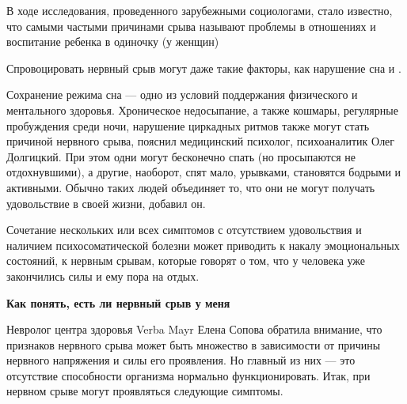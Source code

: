 \begin{framed}
    \begin{center}
        \Large
        В ходе исследования, проведенного зарубежными социологами, стало известно, что самыми частыми причинами срыва называют проблемы в отношениях и воспитание ребенка в одиночку (у женщин)
    \end{center}
\end{framed}

Спровоцировать нервный срыв могут даже такие факторы, как нарушение сна и .

Сохранение режима сна  ---  одно из условий поддержания физического и ментального здоровья. Хроническое недосыпание, а также кошмары, регулярные пробуждения среди ночи, нарушение циркадных ритмов также могут стать причиной нервного срыва, пояснил медицинский психолог, психоаналитик Олег Долгицкий. При этом одни могут бесконечно спать (но просыпаются не отдохнувшими), а другие, наоборот, спят мало, урывками, становятся  бодрыми и активными. Обычно таких людей объединяет то, что они не могут получать удовольствие в своей жизни, добавил он.

Сочетание нескольких или всех  симптомов с отсутствием удовольствия и наличием психосоматической болезни может приводить к накалу эмоциональных состояний, к нервным срывам, которые говорят о том, что у человека уже закончились силы и ему пора на отдых.


\textbf{Как понять, есть ли нервный срыв у меня}

Невролог центра здоровья Verba Mayr Елена Сопова обратила внимание, что признаков нервного срыва может быть множество в зависимости от причины нервного напряжения и силы его проявления. Но главный из них  ---  это отсутствие способности организма нормально функционировать. Итак, при нервном срыве могут проявляться следующие симптомы.

